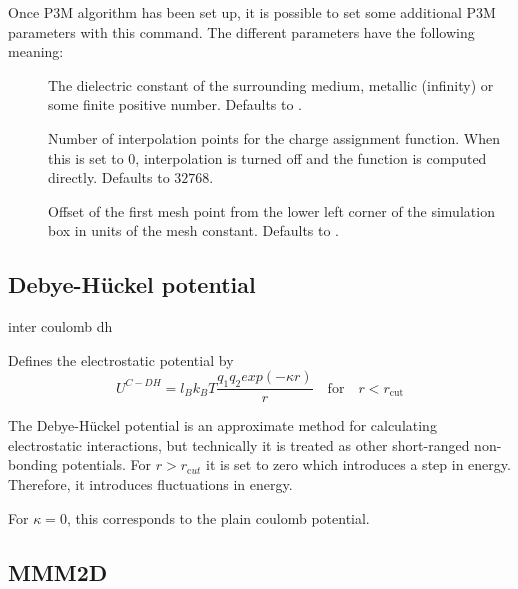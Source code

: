 Once P3M algorithm has been set up, it is possible to set some
additional P3M parameters with this command.  The different parameters
have the following meaning:
\begin{description}
\item[ ] The dielectric constant of the
  surrounding medium, metallic (\ie infinity) or some finite positive
  number.  Defaults to .
\item[ ] Number of interpolation
  points for the charge assignment function.  When this is set to $0$,
  interpolation is turned off and the function is computed directly.
  Defaults to $32768$.
\item[ ] Offset of the first mesh point
  from the lower left corner of the simulation box in units of the
  mesh constant. Defaults to .
\end{description}


\subsection{Debye-H\"uckel potential}

\begin{essyntax}
  inter coulomb  dh \var{\kappa} 
  \begin{features}
  \end{features}
\end{essyntax}

Defines the electrostatic potential by
\begin{equation}
  U^{C-DH} = l_B k_B T \frac{q_1 q_2 exp(-\kappa r)}{r}\quad \mathrm{for}\quad r<r_{\mathrm{cut}}
\end{equation}

The Debye-H\"uckel potential is an approximate method for calculating
electrostatic interactions, but technically it is treated as other
short-ranged non-bonding potentials. For $r>r_{\mathrm cut}$ it is set 
to zero which introduces a step in energy. Therefore, it introduces
fluctuations in energy.

For $\kappa = 0$, this corresponds to the plain coulomb potential.


\subsection{MMM2D}

